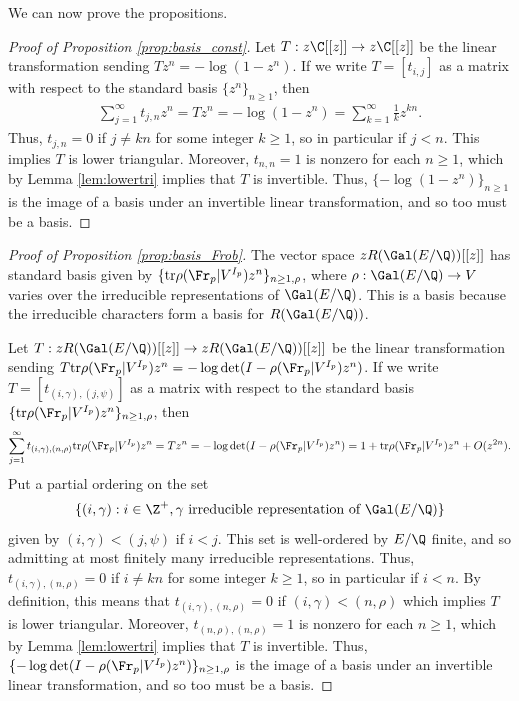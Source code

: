 \documentclass[12pt]{amsart}
\theoremstyle{plain}
\begin{document}
We can now prove the propositions.

\begin{proof}[Proof of Proposition \ref{prop:basis_const}]
    Let $T:z\C[[z]]\to z\C[[z]]$ be the linear transformation sending $Tz^n = -\log(1-z^n)$. If we write $T=[t_{i,j}]$ as a matrix with respect to the standard basis $\{z^n\}_{n\ge 1}$, then
    \begin{align*}
        \sum_{j=1}^{\infty} t_{j,n}z^n = Tz^n = -\log(1-z^n) = \sum_{k=1}^{\infty} \frac{1}{k}z^{kn}.
    \end{align*}
    Thus, $t_{j,n} = 0$ if $j\ne kn$ for some integer $k\ge 1$, so in particular if $j<n$. This implies $T$ is lower triangular. Moreover, $t_{n,n} = 1$ is nonzero for each $n\ge 1$, which by Lemma \ref{lem:lowertri} implies that $T$ is invertible. Thus, $\{-\log(1-z^n)\}_{n\ge 1}$ is the image of a basis under an invertible linear transformation, and so too must be a basis.
\end{proof}

\begin{proof}[Proof of Proposition \ref{prop:basis_Frob}]
    The vector space $zR(\Gal(E/\Q))[[z]]$ has standard basis given by $\{{\rm tr}\rho(\Fr_p|V^{I_p}) z^n\}_{n\ge 1,\rho}$, where $\rho:\Gal(E/\Q)\to V$ varies over the irreducible representations of $\Gal(E/\Q)$. This is a basis because the irreducible characters form a basis for $R(\Gal(E/\Q))$.
    
    Let $T:zR(\Gal(E/\Q))[[z]]\to zR(\Gal(E/\Q))[[z]]$ be the linear transformation sending $T{\rm tr}\rho(\Fr_p|V^{I_p})z^n = -\log\det(I-\rho(\Fr_p|V^{I_p})z^n)$. If we write $T=[t_{(i,\gamma),(j,\psi)}]$ as a matrix with respect to the standard basis $\{{\rm tr}\rho(\Fr_p|V^{I_p})z^n\}_{n\ge 1,\rho}$, then
    \begin{align*}
        \sum_{j=1}^{\infty} t_{(i,\gamma),(n,\rho)}{\rm tr}\rho(\Fr_p|V^{I_p})z^n = Tz^n = -\log\det(I-\rho(\Fr_p|V^{I_p})z^n) = 1 + {\rm tr}\rho(\Fr_p|V^{I_p})z^n + O(z^{2n}).
    \end{align*}
    Put a partial ordering on the set
    \[
        \{(i,\gamma):i\in \Z^+,\gamma\text{ irreducible representation of }\Gal(E/\Q)\}
    \]
    given by $(i,\gamma) < (j,\psi)$ if $i < j$. This set is well-ordered by $E/\Q$ finite, and so admitting at most finitely many irreducible representations. Thus, $t_{(i,\gamma),(n,\rho)} = 0$ if $i\ne kn$ for some integer $k\ge 1$, so in particular if $i<n$. By definition, this means that $t_{(i,\gamma),(n,\rho)} = 0$ if $(i,\gamma) < (n,\rho)$ which implies $T$ is lower triangular. Moreover, $t_{(n,\rho),(n,\rho)} = 1$ is nonzero for each $n\ge 1$, which by Lemma \ref{lem:lowertri} implies that $T$ is invertible. Thus, $\{-\log\det(I-\rho(\Fr_p|V^{I_p})z^n)\}_{n\ge 1,\rho}$ is the image of a basis under an invertible linear transformation, and so too must be a basis.
\end{proof}
\end{document}

